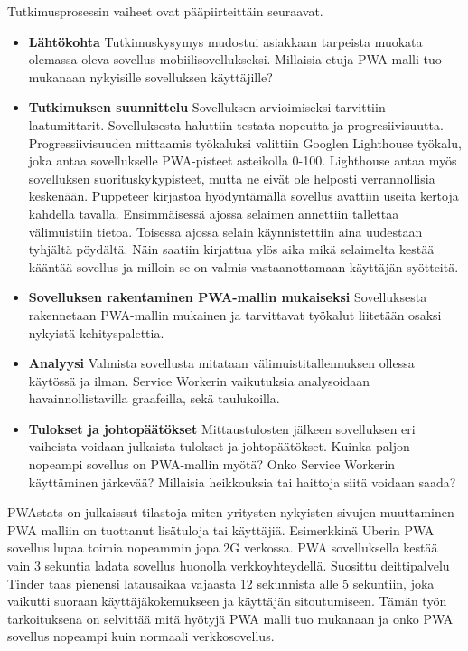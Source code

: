 \documentclass{tktltiki}
\begin{document}
Tutkimusprosessin vaiheet ovat pääpiirteittäin seuraavat.

\begin{itemize}
  \item \textbf{Lähtökohta} Tutkimuskysymys mudostui asiakkaan tarpeista muokata olemassa oleva sovellus mobiilisovellukseksi. Millaisia etuja PWA malli tuo mukanaan nykyisille sovelluksen käyttäjille?
  \item \textbf{Tutkimuksen suunnittelu} Sovelluksen arvioimiseksi tarvittiin laatumittarit. Sovelluksesta haluttiin testata nopeutta ja progresiivisuutta. Progressiivisuuden mittaamis työkaluksi valittiin Googlen Lighthouse työkalu, joka antaa sovellukselle PWA-pisteet asteikolla 0-100. Lighthouse antaa myös sovelluksen suorituskykypisteet, mutta ne eivät ole helposti verrannollisia keskenään. Puppeteer kirjastoa hyödyntämällä sovellus avattiin useita kertoja kahdella tavalla. Ensimmäisessä ajossa selaimen annettiin tallettaa välimuistiin tietoa. Toisessa ajossa selain käynnistettiin aina uudestaan tyhjältä pöydältä. Näin saatiin kirjattua ylös aika mikä selaimelta kestää kääntää sovellus ja milloin se on valmis vastaanottamaan käyttäjän syötteitä. 
  \item \textbf{Sovelluksen rakentaminen PWA-mallin mukaiseksi} Sovelluksesta rakennetaan PWA-mallin mukainen ja tarvittavat työkalut liitetään osaksi nykyistä kehityspalettia.
  \item \textbf{Analyysi} Valmista sovellusta mitataan välimuistitallennuksen ollessa käytössä ja ilman. Service Workerin vaikutuksia analysoidaan havainnollistavilla graafeilla, sekä taulukoilla.
  \item \textbf{Tulokset ja johtopäätökset} Mittaustulosten jälkeen sovelluksen eri vaiheista voidaan julkaista tulokset ja johtopäätökset. Kuinka paljon nopeampi sovellus on PWA-mallin myötä? Onko Service Workerin käyttäminen järkevää? Millaisia heikkouksia tai haittoja siitä voidaan saada?
\end{itemize}

PWAstats \cite{PWAstats} on julkaissut tilastoja miten yritysten nykyisten sivujen muuttaminen PWA malliin on tuottanut lisätuloja tai käyttäjiä. Esimerkkinä \cite{inproceedings} Uberin PWA sovellus lupaa toimia nopeammin jopa 2G verkossa. PWA sovelluksella kestää vain 3 sekuntia ladata sovellus huonolla verkkoyhteydellä. Suosittu deittipalvelu Tinder taas pienensi latausaikaa vajaasta 12 sekunnista alle 5 sekuntiin, joka vaikutti suoraan käyttäjäkokemukseen ja käyttäjän sitoutumiseen. Tämän työn tarkoituksena on selvittää mitä hyötyjä PWA malli tuo mukanaan ja onko PWA sovellus nopeampi kuin normaali verkkosovellus.
\end{document}
